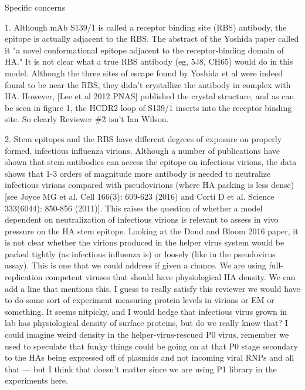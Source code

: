 \documentclass[11pt, oneside]{article}   	%
\begin{document}
Specific concerns

1. Although mAb S139/1 is called a receptor binding site (RBS) antibody, the epitope is actually adjacent to the RBS. The abstract of the Yoshida paper called it "a novel conformational epitope adjacent to the receptor-binding domain of HA." It is not clear what a true RBS antibody (eg, 5J8, CH65) would do in this model.
{\color{red} Although the three sites of escape found by Yoshida et al were indeed found to be near the RBS, they didn't crystallize the antibody in complex with HA. However, [Lee et al 2012 PNAS] published the crystal structure, and as can be seen in figure 1, the HCDR2 loop of S139/1 inserts into the receptor binding site.}
{\color{blue} So clearly Reviewer \#2 isn't Ian Wilson.}

2. Stem epitopes and the RBS have different degrees of exposure on properly formed, infectious influenza virions. Although a number of publications have shown that stem antibodies can access the epitope on infectious virions, the data shows that 1-3 orders of magnitude more antibody is needed to neutralize infectious virions compared with pseudovirions (where HA packing is less dense) [see Joyce MG et al. Cell 166(3): 609-623 (2016) and Corti D et al. Science 333(6044): 850-856 (2011)]. This raises the question of whether a model dependent on neutralization of infectious virions is relevant to assess in vivo pressure on the HA stem epitope. Looking at the Doud and Bloom 2016 paper, it is not clear whether the virions produced in the helper virus system would be packed tightly (as infectious influenza is) or loosely (like in the pseudovirus assay).
{\color{red}
This is one that we could address if given a chance.
We are using full-replication competent viruses that should have physiological HA density. 
We can add a line that mentions this.
}
{\color{blue} I guess to really satisfy this reviewer we would have to do some sort of experiment measuring protein levels in virions or EM or something.  It seems nitpicky, and I would hedge that infectious virus grown in lab has physiological density of surface proteins, but do we really know that? I could imagine weird density in the helper-virus-rescued P0 virus, remember we used to speculate that funky things could be going on at that P0 stage secondary to the HAs being expressed off of plasmids and not incoming viral RNPs and all that --- but I think that doesn't matter since we are using P1 library in the experiments here.}
\end{document}
